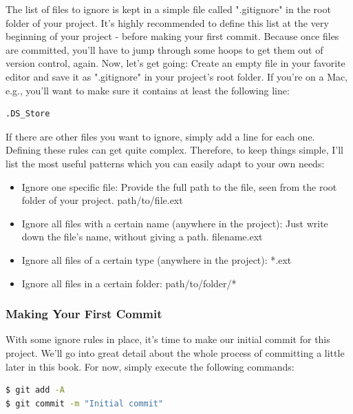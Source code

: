 \documentclass{article}
\begin{document}
The list of files to ignore is kept in a simple file called ".gitignore" in the root folder of your project. It's highly recommended to define this list at the very beginning of your project - before making your first commit. Because once files are committed, you'll have to jump through some hoops to get them out of version control, again.
\newline\newline
Now, let's get going: Create an empty file in your favorite editor and save it as ".gitignore" in your project's root folder. If you're on a Mac, e.g., you'll want to make sure it contains at least the following line:
\newline
\begin{lstlisting}[language=bash]
.DS_Store
\end{lstlisting}

If there are other files you want to ignore, simply add a line for each one. Defining these rules can get quite complex. Therefore, to keep things simple, I'll list the most useful patterns which you can easily adapt to your own needs:
\begin{itemize}
    \item Ignore one specific file: Provide the full path to the file, seen from the root folder of your project.
    \newline
path/to/file.ext
    \item Ignore all files with a certain name (anywhere in the project): Just write down the file's name, without giving a path.
    \newline
filename.ext
    \item Ignore all files of a certain type (anywhere in the project): 
    \newline
    *.ext
    \item  Ignore all files in a certain folder:
    \newline
path/to/folder/*
\end{itemize}

\subsubsection{Making Your First Commit}
With some ignore rules in place, it's time to make our initial commit for this project. We'll go into great detail about the whole process of committing a little later in this book. For now, simply execute the following commands:

\begin{lstlisting}[language=bash]
$ git add -A
$ git commit -m "Initial commit"
\end{lstlisting}
\end{document}
